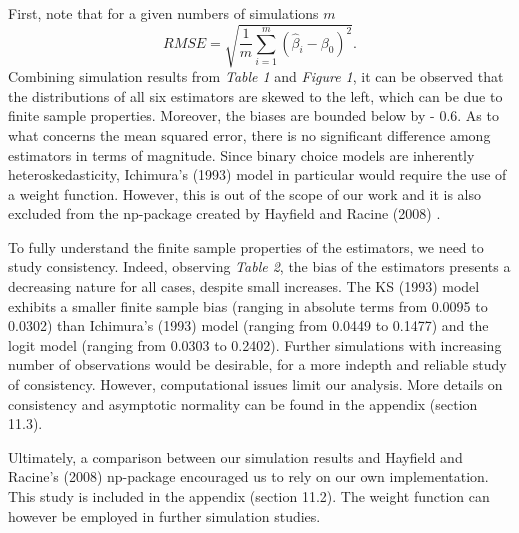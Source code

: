 
First, note that for a given numbers of simulations $m$
\[RMSE = \sqrt{\frac{1}{m}\sum_{i=1}^m\left(\hat{\beta}_i - \beta_0\right)^2}.\]
Combining simulation results from \textit{Table 1} and \textit{Figure 1}, it can be observed that the distributions of all six estimators are skewed to the left, which can be due to finite sample properties. Moreover, the biases are bounded below by - 0.6. 
As to what concerns the mean squared error, there is no significant difference among estimators in terms of magnitude. Since binary choice models are inherently heteroskedasticity, Ichimura’s (1993) \cite{[6]} model in particular would require the use of a weight function. However, this is out of the scope of our work and it is also excluded from the np-package created by Hayfield and Racine (2008) \cite{[28]}.

\begin{table}[H]
\centering
{}
\caption {Bias of the estimators for different sample sizes} \label{tab:Bias of the estimators}
\end{table}
To fully understand the finite sample properties of the estimators, we need to study consistency. Indeed, observing \textit{Table 2}, the bias of the estimators presents a decreasing nature for all cases, despite small increases. The KS (1993) \cite{[12]} model exhibits a smaller finite sample bias (ranging in absolute terms from 0.0095 to 0.0302) than Ichimura's (1993) \citep{[6]} model (ranging from 0.0449 to 0.1477) and the logit model (ranging from 0.0303 to 0.2402). Further simulations with increasing number of observations would be desirable, for a more indepth and reliable study of consistency. However, computational issues limit our analysis. More details on consistency and asymptotic normality can be found in the appendix (section 11.3).

Ultimately, a comparison between our simulation results and Hayfield and Racine's (2008) np-package \cite{[28]} encouraged us to rely on our own implementation. This study is included in the appendix (section 11.2). The weight function can however be employed in further simulation studies. 

